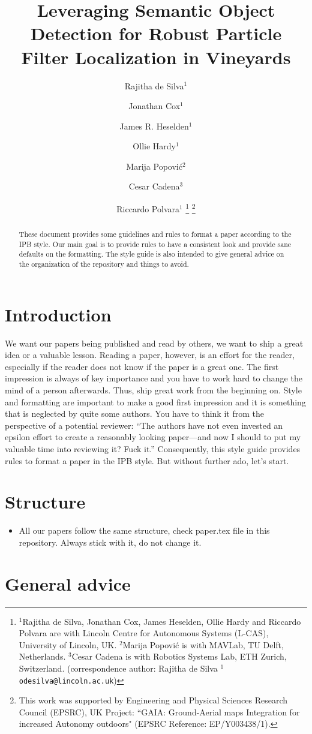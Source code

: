 \documentclass[a4paper, 10 pt, conference]{ieeeconf} %
\title{\LARGE \bf Leveraging Semantic Object Detection for Robust Particle Filter Localization in Vineyards}
\author{Rajitha de Silva$^{1}$ \and Jonathan Cox$^{1}$ \and James R. Heselden$^{1}$ \and Ollie Hardy$^{1}$ \and Marija Popovi\'{c}$^{2}$ \and Cesar Cadena$^{3}$ \and Riccardo Polvara$^{1}$%
  \thanks{$^{1}$Rajitha de Silva, Jonathan Cox, James Heselden, Ollie Hardy and Riccardo Polvara are with Lincoln Centre for Autonomous Systems (L-CAS), University of Lincoln, UK. $^{2}$Marija Popovi\'{c} is with MAVLab, TU Delft, Netherlands. $^{3}$Cesar Cadena is with Robotics Systems Lab, ETH Zurich, Switzerland. (correspondence author: Rajitha de Silva {\tt\small $^{1}$odesilva@lincoln.ac.uk})}%
  \thanks{This work was supported by Engineering and Physical Sciences Research Council (EPSRC), UK Project: ``GAIA: Ground-Aerial maps Integration for increased Autonomy outdoors" (EPSRC Reference: EP/Y003438/1).}%
}
\begin{document}
\maketitle
\thispagestyle{empty}
\pagestyle{empty}


\begin{abstract}
  These document provides some guidelines and rules to format a paper according to the IPB style.
  Our main goal is to provide rules to have a consistent look and provide sane defaults on the formatting.
  The style guide is also intended to give general advice on the organization of the repository and things to avoid.
\end{abstract}


\section{Introduction}
\label{sec:intro}

We want our papers being published and read by others, we want to ship a great idea or a valuable lesson. Reading a paper, however, is an effort for the reader, especially if the reader does not know if the paper is a great one. 
The first impression is always of key  importance and you have to work hard to change the mind of a person afterwards.
Thus, ship great work from the beginning on. Style and formatting are important to make a good first impression and it is  something that is neglected by quite some authors.
You have to think it from the perspective of a potential reviewer: ``The authors have not even invested an epsilon effort to create a reasonably looking paper---and now I should to put my valuable time into reviewing it? Fuck it.''
Consequently, this style guide provides rules to format a paper in the IPB style.
But without further ado, let's start.

\section{Structure}
\begin{itemize}
  \item All our papers follow the same structure, check paper.tex file in this repository. Always stick with it, do not change it.
\end{itemize}

\section{General advice}
\end{document}
